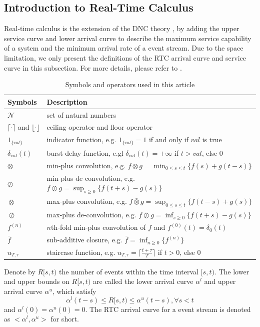 \documentclass[preprint]{elsarticle}
\begin{document}
\subsection{Introduction to Real-Time Calculus}\label{intrortc}
Real-time calculus \cite{1253607} is the extension of the DNC theory \cite{Boudec2001Network}, by adding the upper service curve and lower arrival curve to describe the maximum service capability of a system and the minimum arrival rate of a event stream. Due to the space limitation, we only present the definitions of the RTC arrival curve and service curve in this subsection. For more details, please refer to \cite{1253607}.
\begin{table}
  \centering
  \begin{tabular}{l|l}
    \hline\hline
    Symbols & Description \\
    \hline
    $\mathcal{N}$ & set of natural numbers\\
    $\lceil\cdot\rceil$ and $\lfloor\cdot\rfloor$ & ceiling operator and floor operator\\
    $1_{\{val\}}$ & indicator function, e.g. $1_{\{val\}}=1$ if and only if $val$ is true\\
    $\delta_{val}(t)$ & burst-delay function, e.gl $\delta_{val}(t)=+\infty$ if $t>val$, else 0\\
    $\otimes$ & min-plus convolution, e.g. $f\otimes g=\min_{0\leq s\leq t}\{f(s)+g(t-s)\}$ \\
    $\oslash$ & min-plus de-convolution, e.g. $f\oslash g=\sup_{s\geq 0}\{f(t+s)-g(s)\}$ \\
    $\bar{\otimes}$ & max-plus convolution, e.g. $f\bar{\otimes} g=\sup_{0\leq s\leq t}\{f(t-s)+g(s)\}$ \\
    $\bar{\oslash}$ & max-plus de-convolution, e.g. $f\bar{\oslash} g=\inf_{s\geq 0}\{f(t+s)-g(s)\}$ \\
    $f^{(n)}$ & $n$th-fold min-plus convolution of $f$ and $f^{(0)}(t)=\delta_0(t)$\\
    $\bar{f}$ & sub-additive closure, e.g. $\bar{f}=\inf_{n\geq 0}\{f^{(n)}\}$\\
    $u_{T,\tau}$ & staircase function, e.g. $u_{T,\tau}=\lceil\frac{t+\tau}{T}\rceil$ if $t>0$, else 0\\
    \hline
  \end{tabular}
  \caption{Symbols and operators used in this article}\label{symbol}
\end{table}

\begin{rmk}\label{acu}
Denote by $R[s,t)$ the number of events within the time interval $[s,t)$. The lower and upper bounds on $R[s,t)$ are called the lower arrival curve $\alpha^l$ and upper arrival curve $\alpha^u$, which satisfy
$$\alpha^l(t-s)\leq R[s,t)\leq \alpha^u(t-s),\forall s<t$$
and $\alpha^l(0)=\alpha^u(0)=0$. The RTC arrival curve for a event stream is denoted as $<\alpha^l,\alpha^u>$ for short.
\end{rmk}
\end{document}
